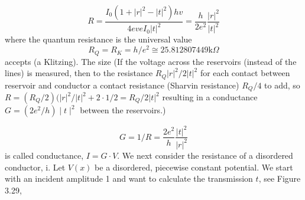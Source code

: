 \begin{equation}
    R=\frac{I_{0}\left(1+|r|^{2}-|t|^{2}\right) h v}{4 e v e I_{0}|t|^{2}}=\frac{h}{2 e^{2}} \frac{|r|^{2}}{|t|^{2}}
    \end{equation}
where the quantum resistance is the universal value
\begin{equation}
    R_{Q}=R_{K}=h / e^{2} \cong 25.812807449 \mathrm{k} \Omega
    \end{equation}
accepts (a Klitzing). The size (If the voltage across the reservoirs (instead of the lines) is measured, then to the resistance $R_Q | r |^2/2|t|^2$ for each contact between reservoir and conductor a contact resistance (Sharvin resistance) $R_Q / 4$ to add, so $R = (R_Q / 2) (| r |^2/|t|^2+2\cdot 1/2=R_Q/2|t|^2$ resulting in a conductance $G = (2e^2/h)\mid t\mid^2$ between the reservoirs.)

\begin{equation}
    G=1 / R=\frac{2 e^{2}}{h} \frac{|t|^{2}}{|r|^{2}}
    \end{equation}
is called conductance, $I = G · V$.
We next consider the resistance of a disordered conductor, i. Let $V (x)$ be a disordered, piecewise constant potential. We start with an incident amplitude 1 and want to calculate the transmission $t$, see Figure 3.29,

